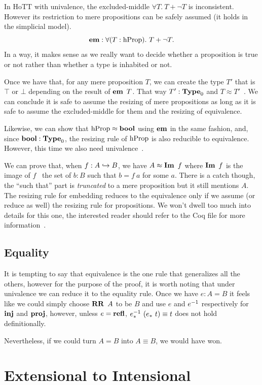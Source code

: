 \documentclass[11pt]{article}
\theoremstyle{plain}
\theoremstyle{remark}
\begin{document}
In HoTT with univalence, the excluded-middle $\forall T.\ T + \neg T$ is
inconsistent. However its restriction to mere propositions can be safely
assumed (it holds in the simplicial model).
\[\operatorname{\mathbf{em}} : \forall (T:\operatorname{hProp}).\ T + \neg T.\]
In a way, it makes sense as we really want to decide whether a proposition is
true or not rather than whether a type is inhabited or not.

Once we have that, for any mere proposition $T$, we can create the type $T'$
that is $\top$ or $\bot$ depending on the result of $\operatorname{\mathbf{em}}\ T$.
That way $T' : \operatorname{\mathbf{Type}}_0$ and $T \approx T'$~.
We can conclude it is safe to assume the resizing of mere propositions as long
as it is safe to assume the excluded-middle for them and the resizing of
equivalence.

Likewise, we can show that $\operatorname{hProp} \approx \operatorname{\mathbf{bool}}$ using $\operatorname{\mathbf{em}}$ in the same
fashion, and, since $\operatorname{\mathbf{bool}} : \operatorname{\mathbf{Type}}_0$, the resizing rule of $\operatorname{hProp}$ is also
reducible to equivalence. However, this time we also need
univalence~.

We can prove that, when $f : A \hookrightarrow B$, we have $A \approx \operatorname{\mathbf{Im}}\ f$
where $\operatorname{\mathbf{Im}}\ f$ is the image of $f$ \ie\ the set of $b : B$ such that $b = f\ a$
for some $a$. There is a catch though, the ``such that'' part is
\emph{truncated} to a mere proposition but it still mentions $A$. The resizing
rule for embedding reduces to the equivalence only if we assume
(or reduce as well) the resizing rule for propositions.
We won't dwell too much into details for this one, the interested reader should
refer to the Coq file for more information~.

\subsection{Equality}
It is tempting to say that equivalence is the one rule that generalizes all the
others, however for the purpose of the proof, it is worth noting that under
univalence we can reduce it to the equality rule.
Once we have $e : A = B$ it feels like we could simply choose $\RR\ A$ to be
$B$ and use $e$ and $e^{-1}$ respectively for $\operatorname{\mathbf{inj}}$ and $\operatorname{\mathbf{proj}}$,
however, unless $e = \operatorname{\mathbf{refl}}$, $e^{-1}_*\ (e_*\ t) \equiv t$ does not hold
definitionally.

Nevertheless, if we could turn $A = B$ into $A \equiv B$, we would have won.

\section{Extensional to Intensional}
\end{document}
